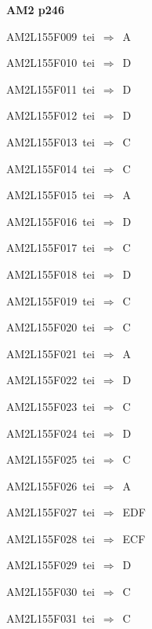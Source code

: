 \par\vfill\eject
{\bf\hfill AM2 p246\hfill\hbox{}}\par\bigskip
{\sixrm AM2L155F009\ {\sixit tei}\ }$\Rightarrow$\ A\par\smallskip
{\sixrm AM2L155F010\ {\sixit tei}\ }$\Rightarrow$\ D\par\smallskip
{\sixrm AM2L155F011\ {\sixit tei}\ }$\Rightarrow$\ D\par\smallskip
{\sixrm AM2L155F012\ {\sixit tei}\ }$\Rightarrow$\ D\par\smallskip
{\sixrm AM2L155F013\ {\sixit tei}\ }$\Rightarrow$\ C\par\smallskip
{\sixrm AM2L155F014\ {\sixit tei}\ }$\Rightarrow$\ C\par\smallskip
{\sixrm AM2L155F015\ {\sixit tei}\ }$\Rightarrow$\ A\par\smallskip
{\sixrm AM2L155F016\ {\sixit tei}\ }$\Rightarrow$\ D\par\smallskip
{\sixrm AM2L155F017\ {\sixit tei}\ }$\Rightarrow$\ C\par\smallskip
{\sixrm AM2L155F018\ {\sixit tei}\ }$\Rightarrow$\ D\par\smallskip
{\sixrm AM2L155F019\ {\sixit tei}\ }$\Rightarrow$\ C\par\smallskip
{\sixrm AM2L155F020\ {\sixit tei}\ }$\Rightarrow$\ C\par\smallskip
{\sixrm AM2L155F021\ {\sixit tei}\ }$\Rightarrow$\ A\par\smallskip
{\sixrm AM2L155F022\ {\sixit tei}\ }$\Rightarrow$\ D\par\smallskip
{\sixrm AM2L155F023\ {\sixit tei}\ }$\Rightarrow$\ C\par\smallskip
{\sixrm AM2L155F024\ {\sixit tei}\ }$\Rightarrow$\ D\par\smallskip
{\sixrm AM2L155F025\ {\sixit tei}\ }$\Rightarrow$\ C\par\smallskip
{\sixrm AM2L155F026\ {\sixit tei}\ }$\Rightarrow$\ A\par\smallskip
{\sixrm AM2L155F027\ {\sixit tei}\ }$\Rightarrow$\ EDF\par\smallskip
{\sixrm AM2L155F028\ {\sixit tei}\ }$\Rightarrow$\ ECF\par\smallskip
{\sixrm AM2L155F029\ {\sixit tei}\ }$\Rightarrow$\ D\par\smallskip
{\sixrm AM2L155F030\ {\sixit tei}\ }$\Rightarrow$\ C\par\smallskip
{\sixrm AM2L155F031\ {\sixit tei}\ }$\Rightarrow$\ C\par\smallskip
